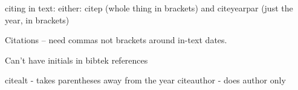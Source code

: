 citing in text: either: citep (whole thing in brackets) and citeyearpar (just the year, in brackets)

Citations – need commas not brackets around in-text dates.

Can't have initials in bibtek references

citealt - takes parentheses away from the year
citeauthor - does author only